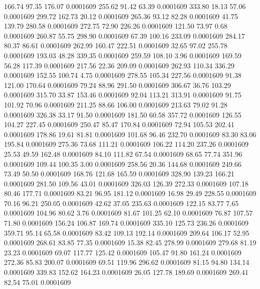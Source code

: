  166.74   97.35  176.07   0.0001609
 255.62   91.42   63.39   0.0001609
 333.80   18.13   57.06   0.0001609
 299.72  162.73   20.12   0.0001609
 265.36   93.12   82.28   0.0001609
  41.75  139.79  280.58   0.0001609
 272.75   72.90  226.26   0.0001609
 121.50   73.97    0.68   0.0001609
 260.87   55.75  298.90   0.0001609
  67.39  100.16  233.09   0.0001609
 284.17   80.37   86.61   0.0001609
 262.99  160.47  222.51   0.0001609
  32.65   97.02  255.78   0.0001609
 193.03   48.28  339.35   0.0001609
 259.59  108.10    3.96   0.0001609
 169.59   56.28  117.39   0.0001609
 217.56   22.36  209.09   0.0001609
 262.93  110.34  336.29   0.0001609
 152.55  100.74    4.75   0.0001609
 278.55  105.34  227.56   0.0001609
  91.38  121.00  170.64   0.0001609
  79.24   88.96  291.50   0.0001609
 306.67   36.76  103.29   0.0001609
 315.70   33.87  153.46   0.0001609
  92.04  113.21  313.91   0.0001609
  91.75  101.92   70.96   0.0001609
 211.25   88.66  106.00   0.0001609
 213.63   79.02   91.28   0.0001609
 326.38   33.17   91.50   0.0001609
 181.50   60.58  357.72   0.0001609
 126.55  104.27  227.45   0.0001609
 250.47   85.47  170.84   0.0001609
  72.94  105.53  202.41   0.0001609
 178.86   19.61   81.81   0.0001609
 101.68   96.46  232.70   0.0001609
  83.30   83.06  195.84   0.0001609
 275.36   73.68  111.21   0.0001609
 106.22  114.20  237.26   0.0001609
  25.53   49.59  162.48   0.0001609
  84.10  111.82   67.54   0.0001609
  68.65   77.74  351.96   0.0001609
 109.44  100.35    3.00   0.0001609
 258.56   20.36  144.68   0.0001609
 249.66   73.49   50.50   0.0001609
 168.76  121.68  165.59   0.0001609
 328.90  139.23  166.21   0.0001609
 281.50  109.56   43.01   0.0001609
 326.03  126.39  272.33   0.0001609
 107.18   80.46  177.71   0.0001609
  83.21   96.95  181.12   0.0001609
  16.98   29.49  228.55   0.0001609
  70.16   96.21  250.05   0.0001609
  42.62   37.05  235.63   0.0001609
 122.15   83.77    7.65   0.0001609
 104.96   80.62    3.76   0.0001609
  81.67  101.25   62.10   0.0001609
  76.87  107.57   71.80   0.0001609
 156.24  106.87  169.74   0.0001609
 335.10  125.73  236.26   0.0001609
 359.71   95.14   65.58   0.0001609
  83.42  109.13  192.14   0.0001609
 209.64  106.17   52.95   0.0001609
 268.61   83.85   77.35   0.0001609
  15.38   82.45  278.99   0.0001609
 279.68   81.19   23.23   0.0001609
  69.07  117.77  125.42   0.0001609
 105.47   91.80  161.24   0.0001609
 272.36   85.83  200.07   0.0001609
  69.51  119.96  296.62   0.0001609
  81.15   94.80  134.14   0.0001609
 339.83  152.62  164.23   0.0001609
  26.05  127.78  189.69   0.0001609
 269.41   82.54   75.01   0.0001609
